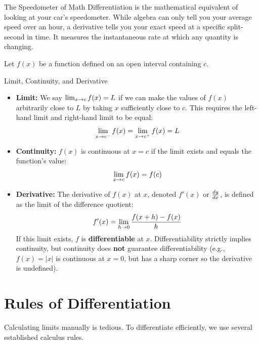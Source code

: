 \begin{intuitionbox}{The Speedometer of Math}
Differentiation is the mathematical equivalent of looking at your car's speedometer. While algebra can only tell you your average speed over an hour, a derivative tells you your exact speed at a specific split-second in time. It measures the instantaneous rate at which any quantity is changing.
\end{intuitionbox}

Let $f(x)$ be a function defined on an open interval containing $c$.

\begin{definitionbox}{Limit, Continuity, and Derivative}
\begin{itemize}
    \item \textbf{Limit:} We say $\lim_{x \to c} f(x) = L$ if we can make the values of $f(x)$ arbitrarily close to $L$ by taking $x$ sufficiently close to $c$. This requires the left-hand limit and right-hand limit to be equal:
    $$\lim_{x \to c^-} f(x) = \lim_{x \to c^+} f(x) = L$$
    \item \textbf{Continuity:} $f(x)$ is continuous at $x = c$ if the limit exists and equals the function's value:
    $$\lim_{x \to c} f(x) = f(c)$$
    \item {}\textbf{Derivative:} The derivative of $f(x)$ at $x$, denoted $f'(x)$ or $\frac{dy}{dx}$, is defined as the limit of the difference quotient:
    $$f'(x) = \lim_{h \to 0} \frac{f(x + h) - f(x)}{h}$$
    If this limit exists, $f$ is \textbf{differentiable} at $x$. Differentiability strictly implies continuity, but continuity does \textbf{not} guarantee differentiability (e.g., $f(x) = |x|$ is continuous at $x=0$, but has a sharp corner so the derivative is undefined).
\end{itemize}
\end{definitionbox}

\section{Rules of Differentiation}

Calculating limits manually is tedious. To differentiate efficiently, we use several established calculus rules.

